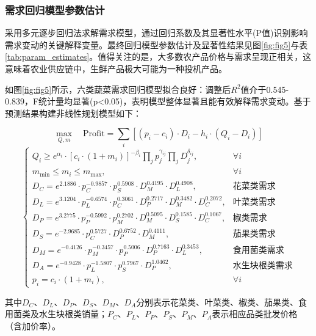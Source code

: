 \documentclass[lang=cn,12pt,a4paper]{elegantpaper}
\begin{document}
\subsubsection{需求回归模型参数估计}
\label{subsubsec:demand_regression_results}
采用多元逐步回归法求解需求模型，通过回归系数及其显著性水平(P值)识别影响需求变动的关键解释变量。最终回归模型参数估计及显著性结果见图\ref{fig:fig5}与表\ref{tab:param_estimates}。值得关注的是，大多数农产品价格与需求呈现正相关，这意味着农业供应链中，生鲜产品极大可能为一种投机产品。

如图\ref{fig:fig5}所示，六类蔬菜需求回归模型拟合良好：调整后$R^2$值介于0.545-0.839，F统计量均显著(p<0.05)，表明模型整体显著且能有效解释需求变动。基于预测结果构建非线性规划模型如下：

\begin{equation}
\max_{Q,m} \quad \text{Profit} = \sum_i \left[ (p_i - c_i) \cdot D_i - h_i \cdot (Q_i - D_i) \right]
\end{equation}
\begin{equation}
\begin{cases}
Q_i \geq e^{\alpha_i} \cdot \left[ c_i \cdot (1 + m_i) \right]^{-\beta_i} \prod_j p_j^{\gamma_{ij}} \prod_j D_j^{\delta_{ij}}, & \forall i \\
m_{\min} \leq m_i \leq m_{\max}, & \forall i \\
D_C = e^{2.1886} \cdot p_C^{-0.9857} \cdot p_S^{0.5908} \cdot D_M^{0.4195} \cdot D_L^{0.4908}, & \text{花菜类需求} \\
D_L = e^{3.1204} \cdot p_L^{-0.6574} \cdot p_C^{0.3061} \cdot D_P^{0.2717} \cdot D_M^{0.3482} \cdot D_C^{0.2072}, & \text{叶菜类需求} \\
D_P = e^{3.2775} \cdot p_P^{-0.5992} \cdot p_M^{0.2702} \cdot D_M^{0.5095} \cdot D_S^{0.1585} \cdot D_C^{0.1067}, & \text{椒类需求} \\
D_S = e^{-2.9685} \cdot p_C^{0.5727} \cdot D_P^{0.6752} \cdot D_M^{0.4111}, & \text{茄果类需求} \\
D_M = e^{-0.4126} \cdot p_M^{-0.3457} \cdot p_P^{0.5006} \cdot D_P^{0.7163} \cdot D_L^{0.3453}, & \text{食用菌类需求} \\
D_A = e^{-0.9428} \cdot p_L^{-1.5807} \cdot p_S^{0.7967} \cdot D_P^{1.0462}, & \text{水生块根类需求} \\
p_i = c_i \cdot (1 + m_i), & \forall i
\end{cases}
\end{equation}

其中$D_C$、$D_L$、$D_P$、$D_S$、$D_M$、$D_A$分别表示花菜类、叶菜类、椒类、茄果类、食用菌类及水生块根类销量；$P_C$、$P_L$、$P_P$、$P_S$、$P_M$、$P_A$表示相应品类批发价格（含加价率）。
\end{document}
